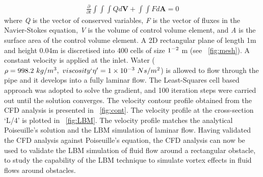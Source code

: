 \begin{align}
\frac{\partial}{\partial t} \int\int\int  Q d\mathbf{V} + \int\int \mathit{F} d\mathbf{A} = 0
\end{align}
where \textit{Q} is the vector of conserved variables, \textit{F} is the vector of fluxes in the Navier-Stokes equation, \textit{V} is the volume of control volume element, and \textit{A} is the surface area of the control volume element. A 2D rectangular plane of length 1m and height 0.04m is discretised into 400 cells of size $1 \time 10^{-2} $ m (see ~\cref{fig:mesh}). A constant velocity is applied at the inlet. Water ($\rho = 998.2\mbox{ }kg/m^{3},\mbox{ } viscosity`\eta'=1 \times 10^{-3}\mbox{ } Ns/m^{2} $) is allowed to flow through the pipe and it develops into a fully laminar flow. The Least-Squares cell based approach was adopted to solve the gradient, and 100 iteration steps were carried out until the solution converges. The velocity contour profile obtained from the CFD analysis is presented in ~\cref{fig:cont}. The velocity profile at the cross-section `L/4' is plotted in ~\cref{fig:LBM}. The velocity profile matches the analytical Poiseuille's solution and the LBM simulation of laminar flow. Having validated the CFD analysis against Poiseuille's equation, the CFD analysis can now be used to validate the LBM simulation of fluid flow around a rectangular obstacle, to study the capability of the LBM technique to simulate vortex effects in fluid flows around obstacles.

